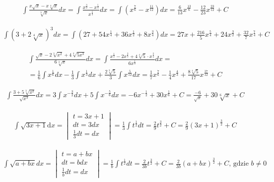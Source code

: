 
\begin{gather*}
  \int \frac{x\sqrt{x}-x\sqrt[4]{x}}{\sqrt[3]{x}}dx
  = \int \frac{x^{\frac{3}{2}}-x^{\frac{5}{4}}}{x^{\frac{1}{3}}}dx
  = \int \left( x^{\frac{7}{6}} - x^{\frac{11}{12}}\right)dx
  = \frac{6}{13}x^{\frac{13}{6}} - \frac{12}{23}x^{\frac{23}{12}}+C
\end{gather*}


\begin{gather*}
  \int (3+2\sqrt[4]{x})^3dx
  = \int \left(27+54x^{\frac{1}{4}}+36x^{\frac{1}{2}}+8x^{\frac{3}{4}}\right)dx
  = 27x+\frac{216}{5}x^{\frac{5}{4}}+24x^{\frac{3}{2}}+\frac{32}{7}x^{\frac{7}{4}}+C
\end{gather*}


\begin{gather*}
  \int \frac{\sqrt{x}-2\sqrt[3]{x^2}+4\sqrt[4]{5x^3}}{6\sqrt[3]{x}}dx
  = \int \frac{x^{\frac{1}{2}}-2x^{\frac{2}{3}}+4\sqrt[4]{5} \cdot x^{\frac{3}{4}}}{6x^{\frac{1}{3}}}dx = \\
  = \frac{1}{6}\int x^{\frac{1}{6}}dx - \frac{1}{3}\int x^{\frac{1}{3}}dx + \frac{2\sqrt[3]{5}}{3} \int x^{\frac{5}{12}}dx
  = \frac{1}{7}x^{\frac{7}{6}}-\frac{1}{4}x^{\frac{4}{3}}+\frac{8\sqrt[4]{5}}{17}x^{\frac{17}{12}}+C
\end{gather*}


\begin{gather*}
  \int \frac{3+5\sqrt[3]{x^2}}{\sqrt{x^3}}dx
  = 3\int x^{-\frac{3}{2}}dx+5\int x^{-\frac{5}{6}}dx
  = -6x^{-\frac{1}{2}}+30x^{\frac{1}{6}}+C
  = \frac{-6}{\sqrt{x}}+30\sqrt[6]{x}+C
\end{gather*}


\begin{gather*}
  \int \sqrt{3x+1} \mbox{d}x
  = \begin{vmatrix}
    t=3x+1 \\
    dt=3dx \\
    \frac{1}{3} dt=dx
  \end{vmatrix}
  = \frac{1}{3} \int t^{\frac{1}{2}}dt
  = \frac{2}{9} t^{\frac{3}{2}} + C
  = \frac{2}{9}(3x+1)^{\frac{3}{2}}+C
\end{gather*}


\begin{gather*}
  \int \sqrt{a+bx}dx =
  \begin{vmatrix}
    t=a+bx \\
    dt=bdx \\
    \frac{1}{b}dt=dx
  \end{vmatrix}
  = \frac{1}{b} \int t^{\frac{1}{2}}dt
  = \frac{2}{3b}t^{\frac{3}{2}}+C
  = \frac{2}{3b}(a+bx)^{\frac{3}{2}}+C \text{, gdzie } b\neq 0
\end{gather*}

